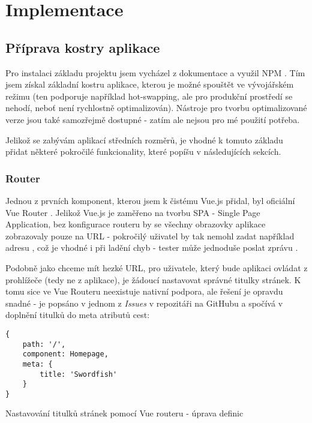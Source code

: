 \chapter{Implementace}\label{implementation}

\section{Příprava kostry aplikace}

Pro instalaci základu projektu jsem vycházel z dokumentace \cite{vue-doc} a využil NPM \cite{npm}. Tím jsem získal základní kostru aplikace, kterou je možné spouštět ve vývojářském režimu (ten podporuje například hot-swapping, ale pro produkční prostředí se nehodí, neboť není rychlostně optimalizován). Nástroje pro tvorbu optimalizované verze jsou také samozřejmě dostupné - zatím ale nejsou pro mé použití potřeba.

Jelikož se zabývám aplikací středních rozměrů, je vhodné k tomuto základu přidat některé pokročilé funkcionality, které popíšu v následujících sekcích.


\subsection{Router}

Jednou z prvních komponent, kterou jsem k čistému Vue.js přidal, byl oficiální Vue Router \cite{vue-router}. Jelikož Vue.js je zaměřeno na tvorbu SPA - Single Page Application, bez konfigurace routeru by se všechny obrazovky aplikace zobrazovaly pouze na URL \code{/} - pokročilý uživatel by tak nemohl zadat například adresu , což je vhodné i při ladění chyb - tester může jednoduše poslat zprávu \emph{}.

Podobně jako chceme mít hezké URL, pro uživatele, který bude aplikaci ovládat z prohlížeče (tedy ne z aplikace), je žádoucí nastavovat správné titulky stránek. K tomu sice ve Vue Routeru neexistuje nativní podpora, ale řešení je opravdu snadné - je popsáno v jednom z \emph{Issues} v repozitáři na GitHubu \cite{vue-router-title} a spočívá v doplnění titulků do meta atributů cest:

\begin{listing}[H]
\begin{verbatim}
{
    path: '/',
    component: Homepage,
    meta: {
        title: 'Swordfish'
    }
}
\end{verbatim}
\caption{Nastavování titulků stránek pomocí Vue routeru - úprava definic} \label{code:vue-router-title1}
\end{listing}

